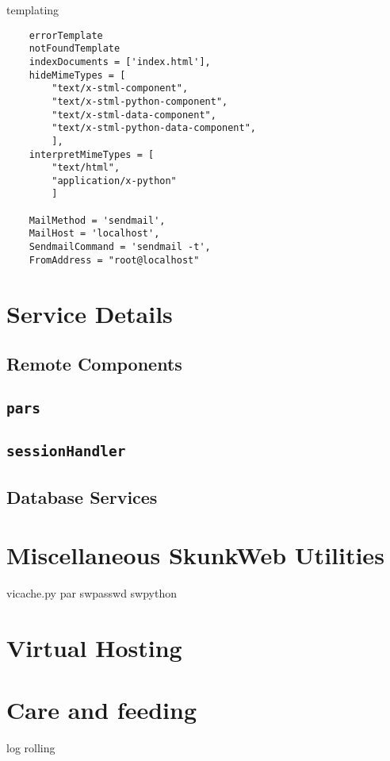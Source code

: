 \documentclass[titlepage]{manual}
\begin{document}
templating
\begin{verbatim}
    errorTemplate
    notFoundTemplate
    indexDocuments = ['index.html'],
    hideMimeTypes = [
        "text/x-stml-component",
        "text/x-stml-python-component",
        "text/x-stml-data-component",
        "text/x-stml-python-data-component",
        ],
    interpretMimeTypes = [
        "text/html",
        "application/x-python"
        ]

    MailMethod = 'sendmail',
    MailHost = 'localhost',
    SendmailCommand = 'sendmail -t',
    FromAddress = "root@localhost"

\end{verbatim}

\chapter{Service Details}

\section{Remote Components}
\label{remotecomponents}
\section{\texttt{pars}}
\section{\texttt{sessionHandler}}
\section{Database Services}
\label{databaseservices}
\chapter{Miscellaneous SkunkWeb Utilities}
vicache.py
\label{pardotpy}
par
\label{swpasswd}
swpasswd
swpython

\chapter{Virtual Hosting}

\chapter{Care and feeding}
  log rolling
\end{document}
